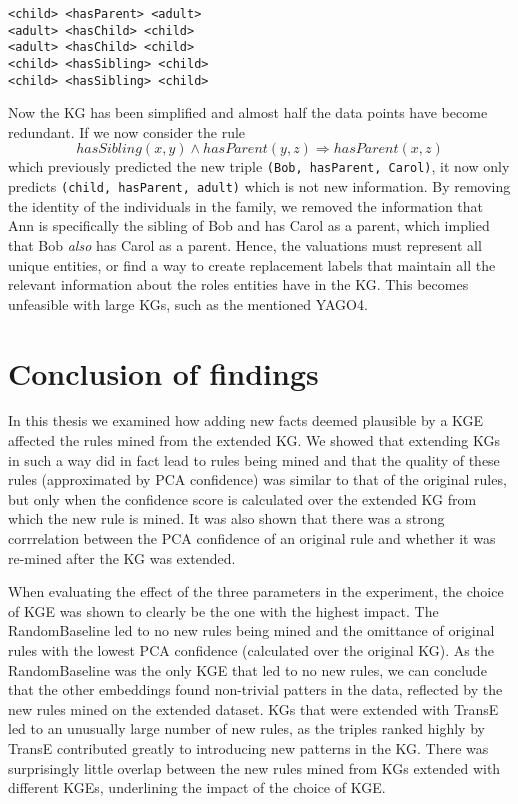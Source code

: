 \begin{example}
\begin{lstlisting}[]
<child> <hasParent> <adult>
<adult> <hasChild> <child>
<adult> <hasChild> <child>
<child> <hasSibling> <child>
<child> <hasSibling> <child>
\end{lstlisting}
\label{mini_simple_KG_rules}
\end{example}

Now the KG has been simplified and almost half the data points have become redundant. If we now consider the rule \[hasSibling(x, y) \wedge hasParent(y,z) \Rightarrow hasParent(x,z)\] which previously predicted the new triple \texttt{(Bob, hasParent, Carol)}, it now only predicts \texttt{(child, hasParent, adult)} which is not new information. By removing the identity of the individuals in the family, we removed the information that Ann is specifically the sibling of Bob and has Carol as a parent, which implied that Bob \textit{also} has Carol as a parent. Hence, the valuations must represent all unique entities, or find a way to create replacement labels that maintain all the relevant information about the roles entities have in the KG. This becomes unfeasible with large KGs, such as the mentioned YAGO4.


\section{Conclusion of findings}
In this thesis we examined how adding new facts deemed plausible by a KGE affected the rules mined from the extended KG. We showed that extending KGs in such a way did in fact lead to rules being mined and that the quality of these rules (approximated by PCA confidence) was similar to that of the original rules, but only when the confidence score is calculated over the extended KG from which the new rule is mined. It was also shown that there was a strong corrrelation between the PCA confidence of an original rule and whether it was re-mined after the KG was extended.

When evaluating the effect of the three parameters in the experiment, the choice of KGE was shown to clearly be the one with the highest impact. The RandomBaseline led to no new rules being mined and the omittance of original rules with the lowest PCA confidence (calculated over the original KG). As the RandomBaseline was the only KGE that led to no new rules, we can conclude that the other embeddings found non-trivial patters in the data, reflected by the new rules mined on the extended dataset. KGs that were extended with TransE led to an unusually large number of new rules, as the triples ranked highly by TransE contributed greatly to introducing new patterns in the KG. There was surprisingly little overlap between the new rules mined from KGs extended with different KGEs, underlining the impact of the choice of KGE.

